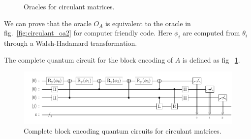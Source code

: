 \documentclass{article}
\begin{document}
    \begin{figure}[htbp]
        \centering
        \caption{Oracles for circulant matrices.}
    \end{figure}

    We can prove that the oracle $O_A$ is equivalent to the oracle in fig.~\ref{fig:circulant_oa2} for computer friendly code. Here $\phi_i$ are computed from $\theta_i$ through a Walsh-Hadamard transformation.

    The complete quantum circuit for the block encoding of $A$ is defined as fig ~\ref{fig:circulant_circuit}.

    \begin{figure}[htbp]
        \centering
        \includegraphics{pdf/circulant_circuit}
        \caption{
            Complete block encoding quantum circuits for circulant matrices.
        }
        \label{fig:circulant_circuit}
    \end{figure}
\end{document}
